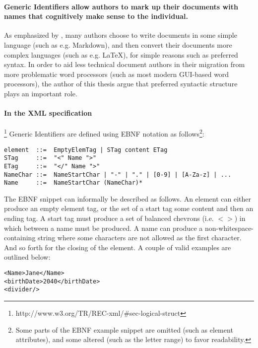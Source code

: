 \documentclass{scrreprt}
\begin{document}
\paragraph{Generic Identifiers allow authors to mark up their documents with names that cognitively make sense to the individual.} As emphasized by \citet{krijnen}, many authors choose to write documents in some simple language (such as e.g. Markdown), and then convert their documents more complex languages (such as e.g. \LaTeX{}), for simple reasons such as preferred syntax. In order to aid less technical document authors in their migration from more problematic word processors (such as most modern GUI-based word processors), the author of this thesis argue that preferred syntactic structure plays an important role.

\paragraph{In the XML specification}\footnote{http://www.w3.org/TR/REC-xml/\#sec-logical-struct} Generic Identifiers are defined using EBNF notation as follows\footnote{Some parts of the EBNF example snippet are omitted (such as element attributes), and some altered (such as the letter range) to favor readability.}:

\begin{lstlisting}
element  ::=  EmptyElemTag | STag content ETag
STag     ::=  "<" Name ">"
ETag     ::=  "</" Name ">"
NameChar ::=  NameStartChar | "-" | "." | [0-9] | [A-Za-z] | ...
Name     ::=  NameStartChar (NameChar)*
\end{lstlisting}

The EBNF snippet can informally be described as follows. An element can either produce an empty element tag, or the set of a start tag some content and then an ending tag. A start tag must produce a set of balanced chevrons (i.e. $<>$) in which between a name must be produced. A name can produce a non-whitespace-containing string where some characters are not allowed as the first character. And so forth for the closing of the element. A couple of valid examples are outlined below:

\begin{lstlisting}
<Name>Jane</Name>
<birthDate>2040</birthDate>
<divider/>
\end{lstlisting}
\end{document}
